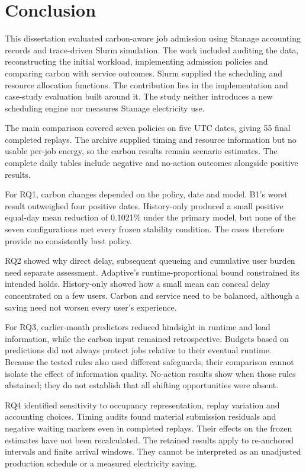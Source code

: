 \chapter{Conclusion}\label{ch:conclusion}
This dissertation evaluated carbon-aware job admission using Stanage accounting records and trace-driven Slurm simulation. The work included auditing the data, reconstructing the initial workload, implementing admission policies and comparing carbon with service outcomes. Slurm supplied the scheduling and resource allocation functions. The contribution lies in the implementation and case-study evaluation built around it. The study neither introduces a new scheduling engine nor measures Stanage electricity use.

The main comparison covered seven policies on five UTC dates, giving 55 final completed replays. The archive supplied timing and resource information but no usable per-job energy, so the carbon results remain scenario estimates. The complete daily tables include negative and no-action outcomes alongside positive results.

For RQ1, carbon changes depended on the policy, date and model. B1's worst result outweighed four positive dates. History-only produced a small positive equal-day mean reduction of 0.1021\% under the primary model, but none of the seven configurations met every frozen stability condition. The cases therefore provide no consistently best policy.

RQ2 showed why direct delay, subsequent queueing and cumulative user burden need separate assessment. Adaptive's runtime-proportional bound constrained its intended holds. History-only showed how a small mean can conceal delay concentrated on a few users. Carbon and service need to be balanced, although a saving need not worsen every user's experience.

For RQ3, earlier-month predictors reduced hindsight in runtime and load information, while the carbon input remained retrospective. Budgets based on predictions did not always protect jobs relative to their eventual runtime. Because the tested rules also used different safeguards, their comparison cannot isolate the effect of information quality. No-action results show when those rules abstained; they do not establish that all shifting opportunities were absent.

RQ4 identified sensitivity to occupancy representation, replay variation and accounting choices. Timing audits found material submission residuals and negative waiting markers even in completed replays. Their effects on the frozen estimates have not been recalculated. The retained results apply to re-anchored intervals and finite arrival windows. They cannot be interpreted as an unadjusted production schedule or a measured electricity saving.

